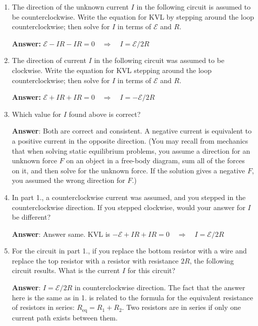 \documentclass{article}
\begin{document}
\begin{enumerate}

  \item The direction of the unknown current $I$ in the following circuit is assumed to be counterclockwise. Write the equation for KVL by stepping around the loop counterclockwise; then solve for $I$ in terms of $\mathcal{E}$ and $R$.

        

        \ifsolutions
        \textbf{Answer:} $\mathcal{E}-IR-IR=0 \quad \Rightarrow \quad I=\mathcal{E}/2R$
        \fi

  \item The direction of current $I$ in the following circuit was assumed to be clockwise. Write the equation for KVL stepping around the loop counterclockwise; then solve for $I$ in terms of $\mathcal{E}$ and $R$.

        

        \ifsolutions
        \textbf{Answer:} $\mathcal{E}+IR+IR=0 \quad \Rightarrow \quad I=-\mathcal{E}/2R$
        \fi

  \item Which value for $I$ found above is correct?

        \ifsolutions
        \textbf{Answer}: Both are correct and consistent. A negative current is equivalent to a positive current in the opposite direction. (You may recall from mechanics that when solving static equilibrium problems, you assume a direction for an unknown force $F$ on an object in a free-body diagram, sum all of the forces on it, and then solve for the unknown force. If the solution gives a negative $F$, you assumed the wrong direction for $F$.)
        \else
        \vskip 36pt
        \fi

  \item In part 1., a counterclockwise current was assumed, and you stepped in the counterclockwise direction. If you stepped clockwise, would your answer for $I$ be different?

        \ifsolutions
        \textbf{Answer}: Answer same. KVL is $-\mathcal{E}+IR+IR=0 \quad \Rightarrow \quad I=\mathcal{E}/2R$
        \else
        \vskip 36pt
        \fi

  \item For the circuit in part 1., if you replace the bottom resistor with a wire and replace the top resistor with a resistor with resistance $2R$, the following circuit results. What is the current $I$ for this circuit?

        

        \ifsolutions
        \textbf{Answer}: $I=\mathcal{E}/2R$ in counterclockwise direction. The fact that the answer here is the same as in 1. is related to the formula for the equivalent resistance of resistors in series: $R_{\text{eq}}=R_1+R_2$. Two resistors are in series if only one current path exists between them.
        \fi

\end{enumerate}
\end{document}
